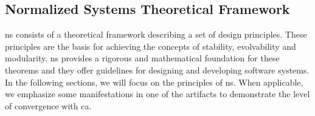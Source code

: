 \subsection{Normalized Systems Theoretical Framework} \label{subsec:ns_desing_theorems}

\gls{ns} consists of a theoretical framework describing a set of design principles. These
principles are the basis for achieving the concepts of stability, evolvability and
modularity. \gls{ns} provides a rigorous and mathematical foundation for these theorems
and they offer guidelines for designing and developing software systems. In the following
sections, we will focus on the principles of \gls{ns}. When applicable, we emphasize some
manifestations in one of the artifacts to demonstrate the level of convergence with
\gls{ca}.
